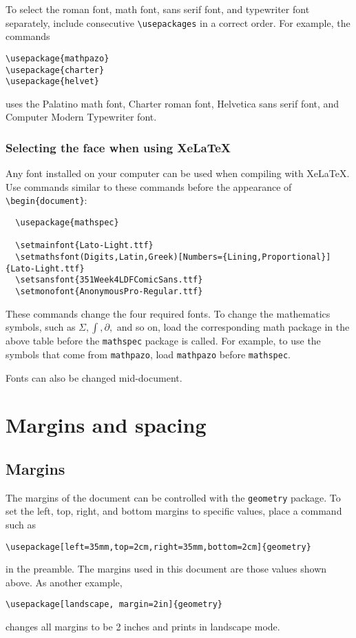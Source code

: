 \documentclass[11pt]{article}
\theoremstyle{definition}
\begin{document}
To select the roman font, math font, sans serif font, and typewriter font separately,
include consecutive \verb~\usepackages~ in a correct order.  For example, the commands
\begin{verbatim}
\usepackage{mathpazo}
\usepackage{charter}
\usepackage{helvet}
\end{verbatim}
uses the Palatino math font, Charter roman font, Helvetica sans serif font, and Computer
Modern Typewriter font.

\subsubsection{Selecting the face when using XeLaTeX}

Any font installed on your computer can be used when compiling with XeLaTeX.  Use commands
similar to these commands before the appearance of \verb~\begin{document}~:

\begin{verbatim}
  \usepackage{mathspec}

  \setmainfont{Lato-Light.ttf}
  \setmathsfont(Digits,Latin,Greek)[Numbers={Lining,Proportional}]{Lato-Light.ttf}
  \setsansfont{351Week4LDFComicSans.ttf}
  \setmonofont{AnonymousPro-Regular.ttf}
\end{verbatim}

These commands change the four required fonts.  To change the mathematics symbols, such
as \(\displaystyle \Sigma, \int, \partial,\) and so on, load the corresponding math package in the
above table before the \verb~mathspec~ package is called.  For example, to use the
symbols that come from \verb~mathpazo~, load \verb~mathpazo~ before \verb~mathspec~.

{\fontsize{4.5ex}{1ex} Fonts
  can also be changed mid-document.}

\section{Margins and spacing}

\subsection{Margins}

The margins of the document can be controlled with the
\verb~geometry~ package.  To set the left, top, right, and bottom
margins to specific values, place a command such as
\begin{verbatim}
\usepackage[left=35mm,top=2cm,right=35mm,bottom=2cm]{geometry}
\end{verbatim}
in the preamble.  The margins used in this document are those values shown above.  As
another example,
\begin{verbatim}
\usepackage[landscape, margin=2in]{geometry}
\end{verbatim}
changes all margins to be 2 inches and prints in landscape mode.
\end{document}
